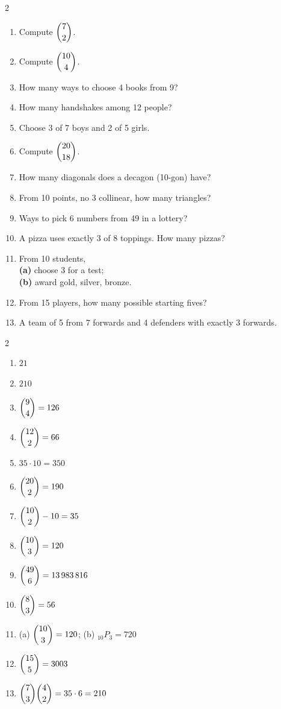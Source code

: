 \documentclass[11pt]{article}
\begin{document}
\begin{recapbox}
\begin{multicols}{2}
\small
\begin{enumerate}[leftmargin=*,itemsep=3pt]
  \item Compute $\dbinom{7}{2}$.
  \item Compute $\dbinom{10}{4}$.
  \item How many ways to choose 4 books from 9?
  \item How many handshakes among 12 people?
  \item Choose 3 of 7 boys and 2 of 5 girls.
  \item Compute $\dbinom{20}{18}$.
  \item How many diagonals does a decagon (10-gon) have?
  \item From 10 points, no 3 collinear, how many triangles?
  \item Ways to pick 6 numbers from 49 in a lottery?
  \item A pizza uses exactly 3 of 8 toppings. How many pizzas?
  \item From 10 students, \\ \textbf{(a)} choose 3 for a test; \\ \textbf{(b)} award gold, silver, bronze.
  \item From 15 players, how many possible starting fives?
  \item A team of 5 from 7 forwards and 4 defenders with exactly 3 forwards.
\end{enumerate}
\end{multicols}
\end{recapbox}

\begin{keybox}
\begin{multicols}{2}
\small
\begin{enumerate}[leftmargin=*,itemsep=3pt]
  \item $21$
  \item $210$
  \item $\dbinom{9}{4}=126$
  \item $\dbinom{12}{2}=66$
  \item $35\cdot10=350$
  \item $\dbinom{20}{2}=190$
  \item $\dbinom{10}{2}-10=35$
  \item $\dbinom{10}{3}=120$
  \item $\dbinom{49}{6}=13\,983\,816$
  \item $\dbinom{8}{3}=56$
  \item (a) $\dbinom{10}{3}=120$; (b) $_{10}P_3=720$
  \item $\dbinom{15}{5}=3003$
  \item $\dbinom{7}{3}\dbinom{4}{2}=35\cdot6=210$
\end{enumerate}
\end{multicols}
\end{keybox}
\end{document}
